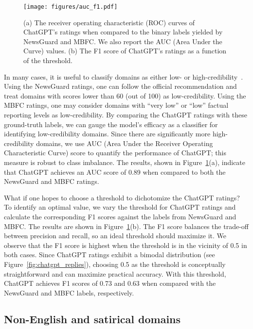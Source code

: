 \documentclass{article}
\begin{document}
\begin{figure}
    \centering
    \texttt{[image: figures/auc\_f1.pdf]}
    \caption{
    (a) The receiver operating characteristic (ROC) curves of ChatGPT's ratings when compared to the binary labels yielded by NewsGuard and MBFC.
    We also report the AUC (Area Under the Curve) values.
    (b) The F1 score of ChatGPT's ratings as a function of the threshold.
    }
    \label{fig:auc_f1}
\end{figure}

In many cases, it is useful to classify domains as either low- or high-credibility~\cite{grinberg2019fake,guess2020exposure}.
Using the NewsGuard ratings, one can follow the official recommendation and treat domains with scores lower than 60 (out of 100) as low-credibility.
Using the MBFC ratings, one may consider domains with ``very low'' or ``low'' factual reporting levels as low-credibility.
By comparing the ChatGPT ratings with these ground-truth labels, we can gauge the model's efficacy as a classifier for identifying low-credibility domains.
Since there are significantly more high-credibility domains, we use AUC (Area Under the Receiver Operating Characteristic Curve) score to quantify the performance of ChatGPT; this measure is robust to class imbalance.
The results, shown in Figure~\ref{fig:auc_f1}(a), indicate that ChatGPT achieves an AUC score of 0.89 when compared to both the NewsGuard and MBFC ratings.

What if one hopes to choose a threshold to dichotomize the ChatGPT ratings?
To identify an optimal value, we vary the threshold for ChatGPT ratings and calculate the corresponding F1 scores against the labels from NewsGuard and MBFC.
The results are shown in Figure~\ref{fig:auc_f1}(b).
The F1 score balances the trade-off between precision and recall, so an ideal threshold should maximize it.
We observe that the F1 score is highest when the threshold is in the vicinity of 0.5 in both cases.
Since ChatGPT ratings exhibit a bimodal distribution (see Figure~\ref{fig:chatgpt_replies}), choosing 0.5 as the threshold is conceptually straightforward and can maximize practical accuracy.
With this threshold, ChatGPT achieves F1 scores of 0.73 and 0.63 when compared with the NewsGuard and MBFC labels, respectively.

\subsection{Non-English and satirical domains}
\end{document}
